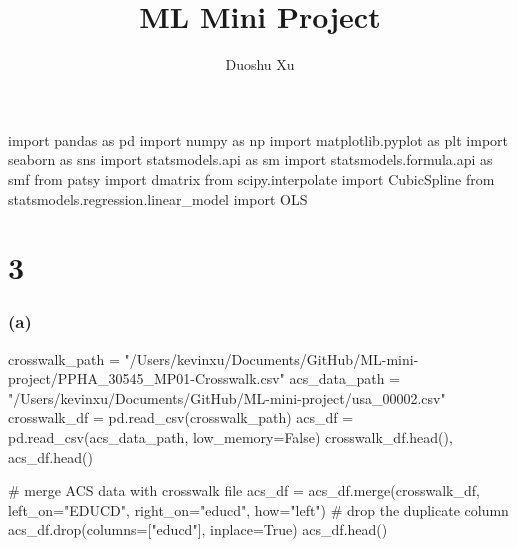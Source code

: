 \documentclass[
  letterpaper,
  DIV=11,
  numbers=noendperiod]{scrartcl}
\title{ML Mini Project}
\author{Duoshu Xu}
\date{}
\newenvironment{Shaded}{\begin{snugshade}}{\end{snugshade}}
\newcommand{\CommentTok}[1]{\textcolor[rgb]{0.37,0.37,0.37}{#1}}
\newcommand{\ImportTok}[1]{\textcolor[rgb]{0.00,0.46,0.62}{#1}}
\newcommand{\NormalTok}[1]{\textcolor[rgb]{0.00,0.23,0.31}{#1}}
\newcommand{\OperatorTok}[1]{\textcolor[rgb]{0.37,0.37,0.37}{#1}}
\newcommand{\StringTok}[1]{\textcolor[rgb]{0.13,0.47,0.30}{#1}}
\newcommand{\VariableTok}[1]{\textcolor[rgb]{0.07,0.07,0.07}{#1}}
\begin{document}
\maketitle



\begin{Shaded}
\begin{Highlighting}[]
\ImportTok{import}\NormalTok{ pandas }\ImportTok{as}\NormalTok{ pd}
\ImportTok{import}\NormalTok{ numpy }\ImportTok{as}\NormalTok{ np}
\ImportTok{import}\NormalTok{ matplotlib.pyplot }\ImportTok{as}\NormalTok{ plt}
\ImportTok{import}\NormalTok{ seaborn }\ImportTok{as}\NormalTok{ sns}
\ImportTok{import}\NormalTok{ statsmodels.api }\ImportTok{as}\NormalTok{ sm}
\ImportTok{import}\NormalTok{ statsmodels.formula.api }\ImportTok{as}\NormalTok{ smf}
\ImportTok{from}\NormalTok{ patsy }\ImportTok{import}\NormalTok{ dmatrix}
\ImportTok{from}\NormalTok{ scipy.interpolate }\ImportTok{import}\NormalTok{ CubicSpline}
\ImportTok{from}\NormalTok{ statsmodels.regression.linear\_model }\ImportTok{import}\NormalTok{ OLS}
\end{Highlighting}
\end{Shaded}

\section{3}\label{section}

\subsubsection{(a)}\label{a}

\begin{Shaded}
\begin{Highlighting}[]
\NormalTok{crosswalk\_path }\OperatorTok{=} \StringTok{"/Users/kevinxu/Documents/GitHub/ML{-}mini{-}project/PPHA\_30545\_MP01{-}Crosswalk.csv"}
\NormalTok{acs\_data\_path }\OperatorTok{=} \StringTok{"/Users/kevinxu/Documents/GitHub/ML{-}mini{-}project/usa\_00002.csv"}
\NormalTok{crosswalk\_df }\OperatorTok{=}\NormalTok{ pd.read\_csv(crosswalk\_path)}
\NormalTok{acs\_df }\OperatorTok{=}\NormalTok{ pd.read\_csv(acs\_data\_path, low\_memory}\OperatorTok{=}\VariableTok{False}\NormalTok{)}
\NormalTok{crosswalk\_df.head(), acs\_df.head()}

\CommentTok{\# merge ACS data with crosswalk file}
\NormalTok{acs\_df }\OperatorTok{=}\NormalTok{ acs\_df.merge(crosswalk\_df, left\_on}\OperatorTok{=}\StringTok{"EDUCD"}\NormalTok{,}
\NormalTok{                      right\_on}\OperatorTok{=}\StringTok{"educd"}\NormalTok{, how}\OperatorTok{=}\StringTok{"left"}\NormalTok{)}
\CommentTok{\# drop the duplicate column}
\NormalTok{acs\_df.drop(columns}\OperatorTok{=}\NormalTok{[}\StringTok{"educd"}\NormalTok{], inplace}\OperatorTok{=}\VariableTok{True}\NormalTok{)}
\NormalTok{acs\_df.head()}
\end{Highlighting}
\end{Shaded}
\end{document}
